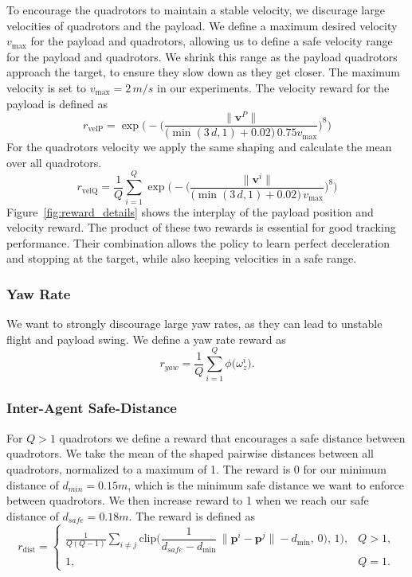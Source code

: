 To encourage the quadrotors to maintain a stable velocity, we discurage large velocities of quadrotors and the payload. We define a maximum desired velocity $v_{\max}$ for the payload and quadrotors, allowing us to define a safe velocity range for the payload and quadrotors. We shrink this range as the payload quadrotors approach the target, to ensure they slow down as they get closer. The maximum velocity is set to $v_{\max}=2\,m/s$ in our experiments. The velocity reward for the payload is defined as
\begin{equation}
r_{\mathrm{velP}}
= \exp\!\Biggl(-\biggl(\frac{\lVert \mathbf{v}^P\rVert}{\bigl(\min(3\,d,1)+0.02\bigr)\,0.75v_{\max}}\biggr)^{8}\Biggr)
\end{equation}
For the quadrotors velocity we apply the same shaping and calculate the mean over all quadrotors.
\begin{equation}
r_{\mathrm{velQ}}
= \frac{1}{Q}\sum_{i=1}^Q \exp\!\Biggl(-\biggl(\frac{\lVert \mathbf{v}^i\rVert}{\bigl(\min(3\,d,1)+0.02\bigr)\,v_{\max}}\biggr)^{8}\Biggr) 
\end{equation}
Figure~\ref{fig:reward_details} shows the interplay of the payload position and velocity reward. The product of these two rewards is essential for good tracking performance. Their combination allows the policy to learn perfect deceleration and stopping at the target, while also keeping velocities in a safe range.
\subsubsection{Yaw Rate}
We want to strongly discourage large yaw rates, as they can lead to unstable flight and payload swing. We define a yaw rate reward as
\begin{equation}
r_{yaw}
= \frac{1}{Q}\sum_{i=1}^{Q}\phi\bigl(\omega_z^i\bigr).
\end{equation}
\subsubsection{Inter-Agent Safe-Distance}
For $Q>1$ quadrotors we define a reward that encourages a safe distance between quadrotors. We take the mean of the shaped pairwise distances between all quadrotors, normalized to a maximum of 1. The reward is 0 for our minimum distance of $d_{min}= 0.15 m$, which is the minimum safe distance we want to enforce between quadrotors. We then increase reward to 1 when we reach our safe distance of $d_{safe}=0.18 m$. The reward is defined as
\begin{equation}
r_{\mathrm{dist}} =
\begin{cases}
\displaystyle
\frac{1}{Q(Q-1)} \sum_{i \neq j}
\mathrm{clip}\bigl(\dfrac{1}{d_{safe}-d_{\min}}\,\|\mathbf{p}^i - \mathbf{p}^j\| - d_{\min},\,0),\,1\bigr),
& Q > 1,\\[1.5ex]
1, & Q = 1.
\end{cases}
\end{equation}


